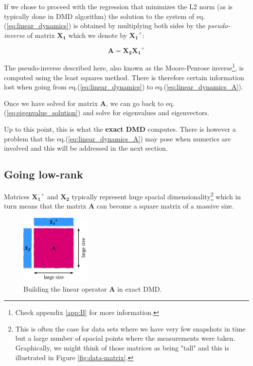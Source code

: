 \documentclass[10pt,twocolumn]{article}
\begin{document}
If we chose to proceed with the regression that minimizes the L2 norm (as is typically done in DMD algorithm) the solution to the system of eq.(\ref{eq:linear_dynamics}) is obtained by multiplying both sides by the \textit{pseudo-inverse} of matrix $\mathbf{X_1}$ which we denote by $\mathbf{X_1}^{+}$:

\begin{equation} \label{eq:linear_dynamics_A}
\mathbf{A} = \mathbf{X_2} \mathbf{X_1}^{+}
\end{equation}

The pseudo-inverse described here, also known as the Moore-Penrose inverse\footnote{Check appendix \ref{app:B} for more information.}, is computed using the least squares method. There is therefore certain information lost when going from eq.(\ref{eq:linear_dynamics}) to eq.(\ref{eq:linear_dynamics_A}).

Once we have solved for matrix $\mathbf{A}$, we can go back to eq.(\ref{eq:eigenvalue_solution}) and solve for eigenvalues and eigenvectors.

Up to this point, this is what the \textbf{exact DMD} computes. There is however a problem that the eq.(\ref{eq:linear_dynamics_A}) may pose when numerics are involved and this will be addressed in the next section. 

\subsection{Going low-rank}

Matrices $\mathbf{X_1}^{+}$ and $\mathbf{X_2}$ typically represent huge spacial dimensionality\footnote{This is often the case for data sets where we have very few snapshots in time but a large number of spacial points where the measurements were taken. Graphically, we might think of those matrices as being "tall" and this is illustrated in Figure \ref{fig:data-matrix}.} which in turn means that the matrix $\mathbf{A}$ can become a square matrix of a massive size. 

\begin{figure}
\centering\includegraphics[width=3.5cm]{getting-A.png}
\caption{Building the linear operator $\mathbf{A}$ in exact DMD.}
\label{fig:building-A}
\end{figure}
\end{document}
